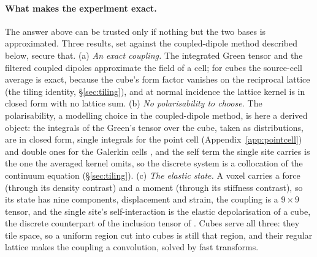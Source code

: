 \documentclass[11pt,a4paper]{article}
\begin{document}
\paragraph{What makes the experiment exact.} The answer above can be trusted only if nothing but the
two bases is approximated. Three results, set against the coupled-dipole method described below, secure
that. (a) \emph{An exact coupling.} The integrated Green tensor and the filtered coupled dipoles
approximate the field of a cell; for cubes the source-cell average is exact, because the cube's form
factor vanishes on the reciprocal lattice (the tiling identity, \S\ref{sec:tiling}), and at normal
incidence the lattice kernel is in closed form with no lattice sum. (b) \emph{No polarisability to
choose.} The polarisability, a modelling choice in the coupled-dipole method, is here a derived object:
the integrals of the Green's tensor over the cube, taken as distributions, are in closed form, single
integrals for the point cell (Appendix~\ref{app:pointcell}) and double ones for the Galerkin cells
\citep{NestorLegendre2026}, and the self term the single site carries is the one the averaged kernel
omits, so the discrete system is a collocation of the continuum equation (\S\ref{sec:tiling}). (c) \emph{The elastic state.} A voxel
carries a force (through its density contrast) and a moment (through its stiffness contrast), so its
state has nine components, displacement and strain, the coupling is a $9\times9$ tensor, and the single
site's self-interaction is the elastic depolarisation of a cube, the discrete counterpart of the
inclusion tensor of \citet{Eshelby1957}. Cubes serve all three: they tile space, so a uniform region
cut into cubes is still that region, and their regular lattice makes the coupling a convolution, solved
by fast transforms.
\end{document}
